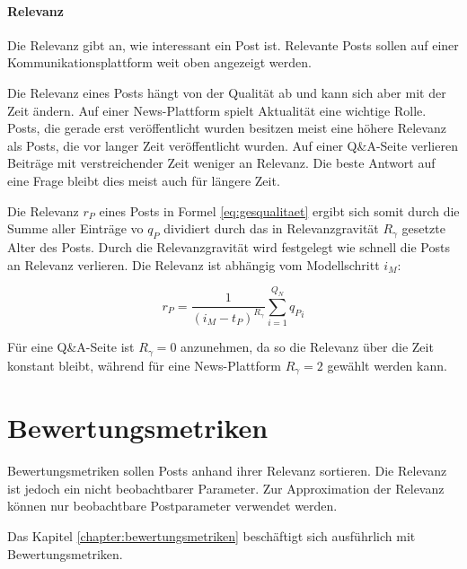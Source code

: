 \paragraph{Relevanz}

Die Relevanz gibt an, wie interessant ein Post ist. Relevante Posts sollen auf einer Kommunikationsplattform weit oben angezeigt werden.

Die Relevanz eines Posts hängt von der Qualität ab und kann sich aber mit der Zeit ändern. Auf einer News-Plattform spielt Aktualität eine wichtige Rolle. Posts, die gerade erst veröffentlicht wurden besitzen meist eine höhere Relevanz als Posts, die vor langer Zeit veröffentlicht wurden. Auf einer Q\&A-Seite verlieren Beiträge mit verstreichender Zeit weniger an Relevanz. Die beste Antwort auf eine Frage bleibt dies meist auch für längere Zeit.

Die Relevanz $r_P$ eines Posts in Formel \ref{eq:gesqualitaet} ergibt sich somit durch die Summe aller Einträge vo $q_P$ dividiert durch das in Relevanzgravität $R_\gamma$ gesetzte Alter des Posts. Durch die Relevanzgravität wird festgelegt wie schnell die Posts an Relevanz verlieren. Die Relevanz ist abhängig vom Modellschritt $i_M$:

\begin{equation}
\label{eq:gesqualitaet}
{r_P} = \frac{1}{(i_M - t_P)^{R_\gamma}}\sum_{i=1}^{Q_N} {q_P}_i
\end{equation}

Für eine Q\&A-Seite ist $R_\gamma = 0$ anzunehmen, da so die Relevanz über die Zeit konstant bleibt, während für eine News-Plattform $R_\gamma = 2$ gewählt werden kann.

\section{Bewertungsmetriken}
\label{sec:bewertungsmetrik}

Bewertungsmetriken sollen Posts anhand ihrer Relevanz sortieren. Die Relevanz ist jedoch ein nicht beobachtbarer Parameter. Zur Approximation der Relevanz können nur beobachtbare Postparameter verwendet werden.

Das Kapitel \ref{chapter:bewertungsmetriken} beschäftigt sich ausführlich mit Bewertungsmetriken.


